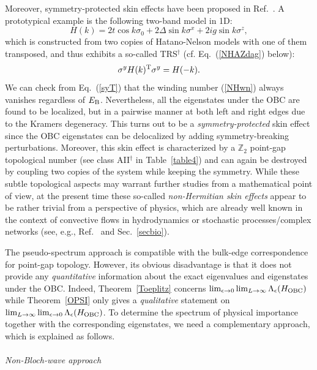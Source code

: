 \documentclass{tADP2e}
\theoremstyle{plain}
\theoremstyle{plain}
\theoremstyle{definition}
\begin{document}
Moreover, {symmetry-protected} skin effects have been proposed in Ref.~\cite{NO20}. A prototypical example is the following two-band model in 1D:
\begin{equation}
H(k)=2t\cos k\sigma_0+2\Delta\sin k\sigma^x+2i g\sin k \sigma^z,
\end{equation} 
which is constructed from two copies of Hatano-Nelson models with one of them transposed, and thus exhibits a so-called TRS$^\dag$ (cf. Eq.~(\ref{NHAZdag}) below):
\begin{equation}
\sigma^y H(k)^{\rm T}\sigma^y=H(-k).
\label{syT}
\end{equation}
We can check from Eq.~(\ref{syT}) that the winding number (\ref{NHwn}) always vanishes regardless of $E_{\rm B}$. Nevertheless, all the eigenstates under the OBC are found to be localized, but in a pairwise manner at both left and right edges due to the Kramers degeneracy. This turns out to be a \emph{symmetry-protected} skin effect since the OBC eigenstates can be delocalized by adding symmetry-breaking perturbations. Moreover, this skin effect is characterized by a $\mathbb{Z}_2$ point-gap topological number (see class AII$^\dag$ in Table~\ref{table4}) and can again be destroyed by coupling two copies of the system while keeping the symmetry. 
While these subtle topological aspects may warrant further studies from a mathematical point of view, at the present time these so-called {\it non-Hermitian skin effects} appear to be rather trivial from a perspective of physics, which are already well known in the context of convective flows in hydrodynamics or stochastic processes/complex networks (see, e.g., Ref.~\cite{MA17} and Sec.~\ref{secbio}). 

The pseudo-spectrum approach is compatible with the bulk-edge correspondence for point-gap topology. However, its obvious disadvantage is that it does not provide any \emph{quantitative} information about the exact eigenvalues and eigenstates under the OBC. Indeed, Theorem~\ref{Toeplitz} concerns $\lim_{\epsilon\to0}\lim_{L\to\infty}\Lambda_\epsilon(H_{\rm OBC})$ while Theorem~\ref{OPSI} only gives a \emph{qualitative} statement on $\lim_{L\to\infty}\lim_{\epsilon\to0}\Lambda_\epsilon(H_{\rm OBC})$. To  determine the spectrum of physical importance 
together with the corresponding eigenstates, we need a complementary approach, which is explained as follows.
\\ \\ {\it Non-Bloch-wave approach}
\end{document}

